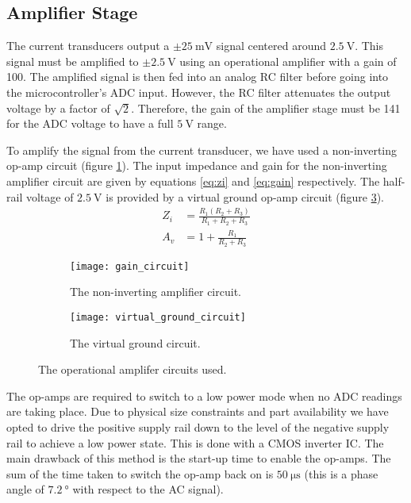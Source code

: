 \subsection{Amplifier Stage}

The current transducers output a $\pm \SI{25}{\milli\volt}$ signal centered around $\SI{2.5}{\volt}$.
This signal must be amplified to $\pm \SI{2.5}{\volt}$ using an operational amplifier with a gain of 100.
The amplified signal is then fed into an analog RC filter before going into the microcontroller's ADC input.
However, the RC filter attenuates the output voltage by a factor of $\sqrt{2}$.
Therefore, the gain of the amplifier stage must be 141 for the ADC voltage to have a full $\SI{5}{\volt}$ range.

To amplify the signal from the current transducer, we have used a non-inverting op-amp circuit (figure \ref{fig:non-inverting-op-amp}).
The input impedance and gain for the non-inverting amplifier circuit are given by equations \ref{eq:zi} and \ref{eq:gain} respectively.
The half-rail voltage of $\SI{2.5}{\volt}$ is provided by a virtual ground op-amp circuit (figure \ref{fig:half-supply}).
\begin{align}
	Z_i &= \frac{R_1 (R_2 + R_3)}{R_1 + R_2 + R_3} \label{eq:zi} \\
	A_v &= 1 + \frac{R_1}{R_2 + R_3}\label{eq:gain}
\end{align}

\begin{figure}[ht]
\centering

\begin{subfigure}[c]{0.45\textwidth}
	\centering
	\texttt{[image: gain\_circuit]}
	\caption{The non-inverting amplifier circuit.}
	\label{fig:non-inverting-op-amp}
\end{subfigure}
\hfill
\begin{subfigure}[c]{0.45\textwidth}
	\centering
	\vfill
	\texttt{[image: virtual\_ground\_circuit]}
	\vfill
	\caption{The virtual ground circuit.}
	\label{fig:half-supply}
\end{subfigure}

\caption{The operational amplifer circuits used.}
\end{figure}

The op-amps are required to switch to a low power mode when no ADC readings are taking place.
Due to physical size constraints and part availability we have opted to drive the positive supply rail down to the level of the negative supply rail to achieve a low power state.
This is done with a CMOS inverter IC.
The main drawback of this method is the start-up time to enable the op-amps.
The sum of the time taken to switch the op-amp back on is $\SI{50}{\micro\second}$ (this is a phase angle of $\SI{7.2}{\degree}$ with respect to the AC signal).

